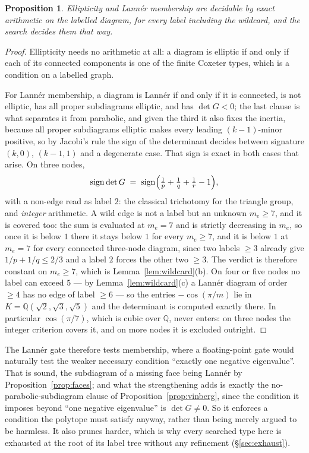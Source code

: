 \documentclass[11pt,reqno]{amsart}
\theoremstyle{plain}
\newtheorem{proposition}[theorem]{Proposition}
\theoremstyle{definition}
\DeclareMathOperator{\sig}{sign}
\newcommand{\QQ}{\mathbb{Q}}
\newcommand{\Gr}{G}
\begin{document}
\begin{proposition}
\label{prop:exactgates}
Ellipticity and Lann\'er membership are decidable by exact arithmetic on the
labelled diagram, for every label including the wildcard, and the search decides
them that way.
\end{proposition}
\begin{proof}
Ellipticity needs no arithmetic at all: a diagram is elliptic if and only if each
of its connected components is one of the finite Coxeter types, which is a
condition on a labelled graph.

For Lann\'er membership, a diagram is Lann\'er if and only if it is connected, is
not elliptic, has all proper subdiagrams elliptic, and has $\det\Gr<0$; the last
clause is what separates it from parabolic, and given the third it also fixes the
inertia, because all proper subdiagrams elliptic makes every leading
$(k-1)$-minor positive, so by Jacobi's rule the sign of the determinant decides
between signature $(k,0)$, $(k-1,1)$ and a degenerate case. That sign is exact in
both cases that arise. On three nodes,
\[
  \sig\det\Gr \;=\; \sig\Bigl(\tfrac1p+\tfrac1q+\tfrac1r-1\Bigr),
\]
with a non-edge read as label $2$: the classical trichotomy for the triangle group,
and \emph{integer} arithmetic. A wild edge is not a label but an unknown $m_e\ge7$,
and it is covered too: the sum is evaluated at $m_e=7$ and is strictly decreasing in
$m_e$, so once it is below $1$ there it stays below $1$ for every $m_e\ge7$, and it
is below $1$ at $m_e=7$ for every connected three-node diagram, since two labels
$\ge3$ already give $1/p+1/q\le2/3$ and a label $2$ forces the other two $\ge3$. The
verdict is therefore constant on $m_e\ge7$, which is Lemma~\ref{lem:wildcard}(b). On four or five nodes no
label can exceed $5$ --- by Lemma~\ref{lem:wildcard}(c) a Lann\'er diagram of order
$\ge4$ has no edge of label $\ge6$ --- so the entries $-\cos(\pi/m)$ lie in
$K=\QQ(\sqrt2,\sqrt3,\sqrt5)$ and the determinant is computed exactly there. In
particular $\cos(\pi/7)$, which is cubic over $\QQ$, never enters: on three nodes
the integer criterion covers it, and on more nodes it is excluded outright.
\end{proof}

The Lann\'er gate therefore tests membership, where a floating-point gate would
naturally test the weaker necessary condition ``exactly one negative
eigenvalue''. That is sound, the subdiagram of a missing face being Lann\'er by
Proposition~\ref{prop:faces}; and what the strengthening adds is exactly the
no-parabolic-subdiagram clause of Proposition~\ref{prop:vinberg}, since the
condition it imposes beyond ``one negative eigenvalue'' is $\det\Gr\neq0$. So it
enforces a condition the polytope must satisfy anyway, rather than being merely
argued to be harmless. It also prunes harder, which is why every searched type here
is exhausted at the root of its label tree without any refinement
(\S\ref{sec:exhaust}).
\end{document}
